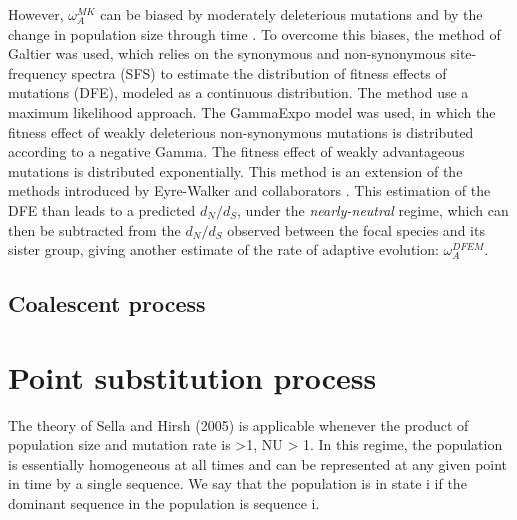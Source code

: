However, $\omega_A^{MK}$ can be biased by moderately deleterious mutations \cite{eyre-walker_quantifying_2002} and by the change in population size through time \cite{eyre-walker_changing_2002}. To overcome this biases, the method of Galtier \cite{galtier_adaptive_2016} was used, which relies on the synonymous and non-synonymous site-frequency spectra (SFS) to estimate the distribution of fitness effects of mutations (DFE), modeled as a continuous distribution. The method use a maximum likelihood approach. The GammaExpo model was used, in which the fitness effect of weakly deleterious non-synonymous mutations is distributed according to a negative Gamma. The fitness effect of weakly advantageous mutations is distributed exponentially. This method is an extension of the methods introduced by Eyre-Walker and collaborators \cite{eyre-walker_distribution_2006, eyre-walker_estimating_2009}. This estimation of the DFE than leads to a predicted $d_N/d_S$, under the \textit{nearly-neutral} regime, which can then be subtracted from the $d_N/d_S$ observed between the focal species and its sister group, giving another estimate of the rate of adaptive evolution: $\omega_A^{DFEM}$.

\subsection{Coalescent process}

\section{Point substitution process}
The theory of Sella and Hirsh (2005) is
applicable whenever the product of population size
and mutation rate is >1, NU > 1. In this regime, the
population is essentially homogeneous at all times and
can be represented at any given point in time by a single
sequence. We say that the population is in state i if the
dominant sequence in the population is sequence i. 


